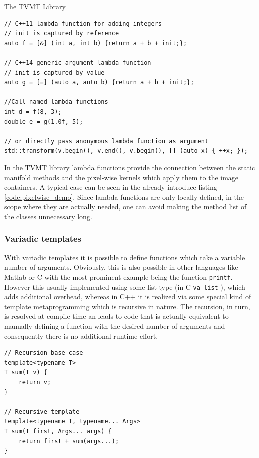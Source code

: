 \begin{chapter}{The TVMT Library}
\begin{lstlisting}[label=code:lambdafun,caption={Lambda functions}]
// C++11 lambda function for adding integers
// init is captured by reference
auto f = [&] (int a, int b) {return a + b + init;};

// C++14 generic argument lambda function
// init is captured by value
auto g = [=] (auto a, auto b) {return a + b + init;};

//Call named lambda functions
int d = f(8, 3);
double e = g(1.0f, 5);

// or directly pass anonymous lambda function as argument
std::transform(v.begin(), v.end(), v.begin(), [] (auto x) { ++x; });
\end{lstlisting}

In the TVMT library lambda functions provide the connection between the static manifold methods and the pixel-wise kernels which apply them to the image containers.
A typical case can be seen in the already introduce listing \ref{code:pixelwise_demo}. Since lambda functions are only locally defined, in the scope where they are actually needed,
one can avoid making the method list of the classes unnecessary long.

\subsubsection{Variadic templates} %
\label{ssub:Variadic templates}
With variadic templates it is possible to define functions which take a variable number of arguments. Obviously, this is also possible in other languages like Matlab or
C with the most prominent example being the function \texttt{printf}. However this usually implemented using some list type (in C \texttt{va\_list} ), which adds additional 
overhead, whereas in C++ it is realized via some special kind of template metaprogramming which is recursive in nature. The recursion, in turn, is resolved at compile-time
an leads to code that is actually equivalent to manually defining a function with the desired number of arguments and consequently there is no additional runtime effort.\\

\cppinline
\begin{lstlisting}[label=code:variadic,caption={Variadic template example}]
// Recursion base case
template<typename T>
T sum(T v) {
    return v;
}

// Recursive template
template<typename T, typename... Args>
T sum(T first, Args... args) {
    return first + sum(args...);
}
\end{lstlisting}


\end{chapter}
